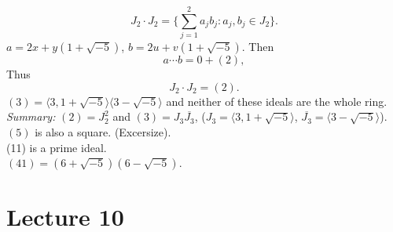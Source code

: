 \documentclass[twoside, openright, fontsize=10pt, headings=big]{scrbook}
\begin{document}
\[
    J_2\cdot J_2=\{\sum_{j=1}^{2}a_jb_j:a_j,b_j\in J_2\}.
\]
$a=2x+y(1+\sqrt{-5})$, $b=2u+v(1+\sqrt{-5})$. Then
\[
    a\cdots b=0+(2),
\]
Thus
\[
    J_2\cdot J_2=(2).
\]
$(3)=\langle3,1+\sqrt{-5} \rangle\langle3-\sqrt{-5} \rangle$ and neither of these ideals are the whole ring.\\
\textit{Summary:} $(2)=J_2^2$ and $(3)=J_3\overline{J_3}$, ($J_3=\langle3,1+\sqrt{-5} \rangle$, $\overline{J_3}=\langle3-\sqrt{-5} \rangle$).\\
$(5)$ is also a square. (Excersize).\\
(11) is a prime ideal.\\
$(41)=(6+\sqrt{-5})(6-\sqrt{-5})$.

\chapter{Lecture 10}
\end{document}
